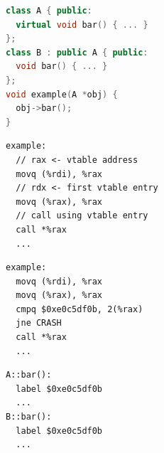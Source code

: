\documentclass[tikz]{standalone}
\begin{document}
\begin{lrbox}{\checkVTableACode}
\begin{lstlisting}[language=C++,style=smaller]
class A { public:
  virtual void bar() { ... }
};
class B : public A { public:
  void bar() { ... }
};
void example(A *obj) {
  obj->bar();
}
\end{lstlisting}
\end{lrbox}
\begin{lrbox}{\checkVTableAAsmA}
\begin{lstlisting}[language=myasm,style=smaller]
example:
  // rax <- vtable address
  movq (%rdi), %rax
  // rdx <- first vtable entry
  movq (%rax), %rax
  // call using vtable entry
  call *%rax
  ...
\end{lstlisting}
\end{lrbox}
\begin{lrbox}{\checkVTableAAsmB}
\begin{lstlisting}[language=myasm,style=smaller]
example:
  movq (%rdi), %rax
  movq (%rax), %rax
  cmpq $0xe0c5df0b, 2(%rax)
  jne CRASH
  call *%rax
  ...
\end{lstlisting}
\end{lrbox}
\begin{lrbox}{\checkVTableAAsmC}
\begin{lstlisting}[language=myasm,style=smaller]
A::bar():
  label $0xe0c5df0b
  ...
B::bar():
  label $0xe0c5df0b
  ...
\end{lstlisting}
\end{lrbox}




\end{document}
